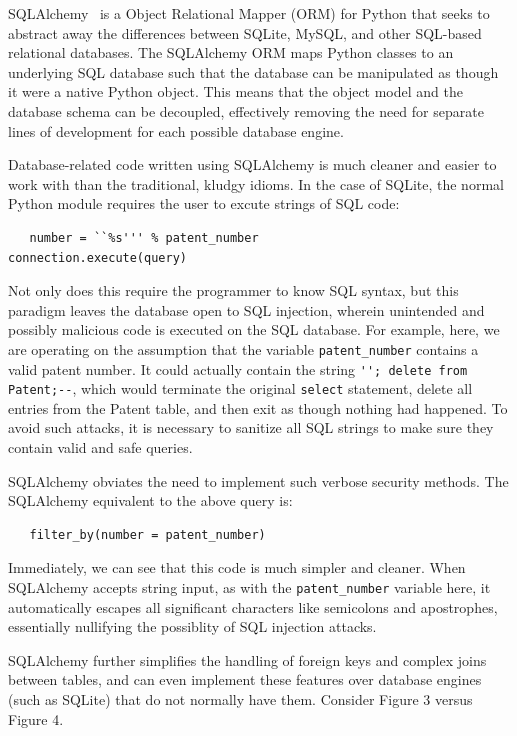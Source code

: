 SQLAlchemy~\cite{sqlalchemy} is a Object Relational Mapper (ORM)
for Python that seeks to abstract away the differences between SQLite,
MySQL, and other SQL-based relational databases. The SQLAlchemy ORM
maps Python classes to an underlying SQL database such that the database
can be manipulated as though it were a native Python object. This
means that the object model and the database schema can be decoupled,
effectively removing the need for separate lines of development for
each possible database engine.

Database-related code written using SQLAlchemy is much cleaner and
easier to work with than the traditional, kludgy idioms. In the case
of SQLite, the normal Python module requires the user to excute strings
of SQL code: 
\begin{lstlisting}
   number = ``%s''' % patent_number
connection.execute(query)
\end{lstlisting}


Not only does this require the programmer to know SQL syntax, but
this paradigm leaves the database open to SQL injection, wherein unintended
and possibly malicious code is executed on the SQL database. For example,
here, we are operating on the assumption that the variable \verb`patent_number`
contains a valid patent number. It could actually contain the string
\verb`''; delete from Patent;--`, which would terminate the original
\verb`select` statement, delete all entries from the Patent table,
and then exit as though nothing had happened. To avoid such attacks,
it is necessary to sanitize all SQL strings to make sure they contain
valid and safe queries.

SQLAlchemy obviates the need to implement such verbose security methods.
The SQLAlchemy equivalent to the above query is:

\begin{lstlisting}
   filter_by(number = patent_number)
\end{lstlisting}


Immediately, we can see that this code is much simpler and cleaner.
When SQLAlchemy accepts string input, as with the \verb`patent_number`
variable here, it automatically escapes all significant characters
like semicolons and apostrophes, essentially nullifying the possiblity
of SQL injection attacks.

SQLAlchemy further simplifies the handling of foreign keys and complex
joins between tables, and can even implement these features over database
engines (such as SQLite) that do not normally have them. Consider
Figure 3 versus Figure 4.


